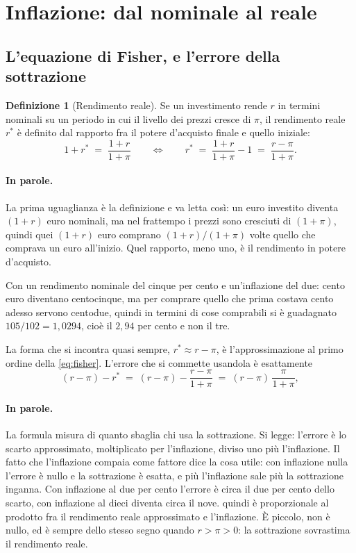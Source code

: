 \documentclass[11pt,a4paper]{article}
\theoremstyle{definition}
\newtheorem{definizione}{Definizione}[section]
\theoremstyle{plain}
\begin{document}
\section{Inflazione: dal nominale al reale}

\subsection{L'equazione di Fisher, e l'errore della sottrazione}

\begin{definizione}[Rendimento reale]
Se un investimento rende $r$ in termini nominali su un periodo in cui il livello dei prezzi cresce di $\pi$, il rendimento reale $r^*$ è definito dal rapporto fra il potere d'acquisto finale e quello iniziale:
\begin{equation}
1 + r^* \;=\; \frac{1+r}{1+\pi}
\qquad\Longleftrightarrow\qquad
r^* \;=\; \frac{1+r}{1+\pi} - 1 \;=\; \frac{r-\pi}{1+\pi}.
\label{eq:fisher}
\end{equation}

\paragraph{In parole.} La prima uguaglianza è la definizione e va letta così: un euro investito diventa $(1+r)$ euro nominali, ma nel frattempo i prezzi sono cresciuti di $(1+\pi)$, quindi quei $(1+r)$ euro comprano $(1+r)/(1+\pi)$ volte quello che comprava un euro all'inizio. Quel rapporto, meno uno, è il rendimento in potere d'acquisto.

Con un rendimento nominale del cinque per cento e un'inflazione del due: cento euro diventano centocinque, ma per comprare quello che prima costava cento adesso servono centodue, quindi in termini di cose comprabili si è guadagnato $105/102 = 1{,}0294$, cioè il $2{,}94$ per cento e non il tre.
\end{definizione}

La forma che si incontra quasi sempre, $r^* \approx r - \pi$, è l'approssimazione al primo ordine della \eqref{eq:fisher}. L'errore che si commette usandola è esattamente
\begin{equation}
(r-\pi) - r^* \;=\; (r-\pi) - \frac{r-\pi}{1+\pi} \;=\; (r-\pi)\,\frac{\pi}{1+\pi},
\label{eq:errore-fisher}
\end{equation}

\paragraph{In parole.} La formula misura di quanto sbaglia chi usa la sottrazione. Si legge: l'errore è lo scarto approssimato, moltiplicato per l'inflazione, diviso uno più l'inflazione. Il fatto che l'inflazione compaia come fattore dice la cosa utile: con inflazione nulla l'errore è nullo e la sottrazione è esatta, e più l'inflazione sale più la sottrazione inganna. Con inflazione al due per cento l'errore è circa il due per cento dello scarto, con inflazione al dieci diventa circa il nove.
quindi è proporzionale al prodotto fra il rendimento reale approssimato e l'inflazione. È piccolo, non è nullo, ed è sempre dello stesso segno quando $r>\pi>0$: la sottrazione sovrastima il rendimento reale.
\end{document}
